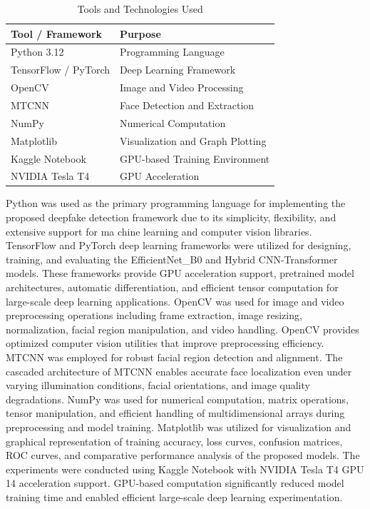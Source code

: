 \documentclass[12pt,a4paper]{report}
\begin{document}
\begin{table}[H]
\centering
\begin{tabular}{|l|l|}
\hline
\textbf{Tool / Framework} & \textbf{Purpose} \\
\hline
Python 3.12 & Programming Language \\
TensorFlow / PyTorch & Deep Learning Framework \\
OpenCV & Image and Video Processing \\
MTCNN & Face Detection and Extraction \\
NumPy & Numerical Computation \\
Matplotlib & Visualization and Graph Plotting \\
Kaggle Notebook & GPU-based Training Environment \\
NVIDIA Tesla T4 & GPU Acceleration \\
\hline
\end{tabular}
\caption{Tools and Technologies Used}
\end{table}


Python was used as the primary programming language for implementing the proposed deepfake detection framework due to its simplicity, flexibility, and extensive support for ma chine learning and computer vision libraries. TensorFlow and PyTorch deep learning frameworks were utilized for designing, training, and evaluating the EfficientNet\_B0 and Hybrid CNN-Transformer models. These frameworks provide GPU acceleration support, pretrained model architectures, automatic differentiation, and efficient tensor computation for large-scale deep learning applications. OpenCV was used for image and video preprocessing operations including frame extraction, image resizing, normalization, facial region manipulation, and video handling. OpenCV provides optimized computer vision utilities that improve preprocessing efficiency. MTCNN was employed for robust facial region detection and alignment. The cascaded architecture of MTCNN enables accurate face localization even under varying illumination conditions, facial orientations, and image quality degradations. NumPy was used for numerical computation, matrix operations, tensor manipulation, and efficient handling of multidimensional arrays during preprocessing and model training. Matplotlib was utilized for visualization and graphical representation of training accuracy, loss curves, confusion matrices, ROC curves, and comparative performance analysis of the proposed models. The experiments were conducted using Kaggle Notebook with NVIDIA Tesla T4 GPU 14 acceleration support. GPU-based computation significantly reduced model training time and enabled efficient large-scale deep learning experimentation.
\end{document}
